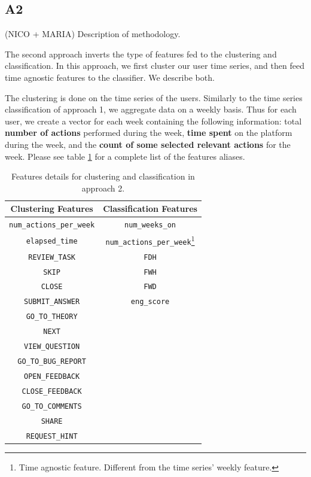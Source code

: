 \documentclass[sigplan,screen]{acmart}
\begin{document}
\subsection{A2}\label{subsec:A2}
{\color{red}(NICO + MARIA) Description of methodology.}     

The second approach inverts the type of features fed to the clustering and classification. In this approach, we first cluster our user time series, and then feed time agnostic features to the classifier. We describe both.

The clustering is done on the time series of the users. Similarly to the time series classification of approach 1, we aggregate data on a weekly basis. Thus for each user, we create a vector for each week containing the following information: total \textbf{number of actions} performed during the week, \textbf{time spent} on the platform during the week, and the \textbf{count of some selected relevant actions} for the week. Please see table \ref{tab:A2_feature_vectors} for a complete list of the features aliases.

\begin{table}[h]
    \centering
    \begin{tabular}{|c|c|}
    \hline
        Clustering Features & Classification Features \\ \hline
        \texttt{num\_actions\_per\_week} & \texttt{num\_weeks\_on}\\ 
        \texttt{elapsed\_time} & \texttt{num\_actions\_per\_week}\footnote{Time agnostic feature. Different from the time series' weekly feature.}\\
        \texttt{REVIEW\_TASK} & \texttt{FDH}\\ 
        \texttt{SKIP} & \texttt{FWH} \\ 
        \texttt{CLOSE} & \texttt{FWD} \\ 
        \texttt{SUBMIT\_ANSWER} & \texttt{eng\_score}\\ 
        \texttt{GO\_TO\_THEORY} & \\ 
        \texttt{NEXT} & \\ 
        \texttt{VIEW\_QUESTION} & \\ 
        \texttt{GO\_TO\_BUG\_REPORT} & \\ 
        \texttt{OPEN\_FEEDBACK} & \\ 
        \texttt{CLOSE\_FEEDBACK} & \\ 
        \texttt{GO\_TO\_COMMENTS} & \\ 
        \texttt{SHARE} & \\ 
        \texttt{REQUEST\_HINT} & \\ \hline
    \end{tabular}
    \caption{Features details for clustering and classification in approach 2.}
    \label{tab:A2_feature_vectors}
\end{table}
\end{document}
